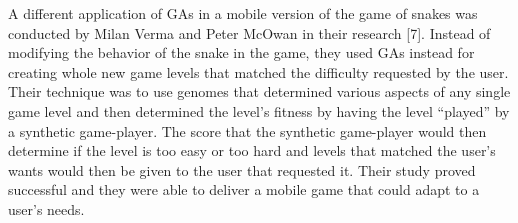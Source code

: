 	A different application of GAs in a mobile version of the game of snakes was conducted by Milan Verma and Peter McOwan in their research [7]. Instead of modifying the behavior of the 
	snake in the game, they used GAs instead for creating whole new game levels that matched the difficulty requested by the user. Their technique was to use genomes that determined various 
	aspects of any single game level and then determined the level's fitness by having the level “played” by a synthetic game-player. The score that the synthetic game-player would then determine 
	if the level is too easy or too hard and levels that matched the user's wants would then be given to the user that requested it. Their study proved successful and they were able to deliver a 
	mobile game that could adapt to a user's needs.